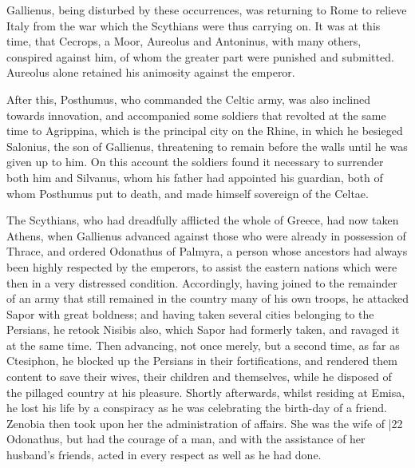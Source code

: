 Gallienus, being disturbed by these occurrences, was returning to Rome to relieve Italy from the war which the Scythians were thus carrying on. It was at this time, that Cecrops, a Moor, Aureolus and Antoninus, with many others, conspired against him, of whom the greater part were punished and submitted. Aureolus alone retained his animosity against the emperor.

After this, Posthumus, who commanded the Celtic army, was also inclined towards innovation, and accompanied some soldiers that revolted at the same time to Agrippina, which is the principal city on the Rhine, in which he besieged Salonius, the son of Gallienus, threatening to remain before the walls until he was given up to him. On this account the soldiers found it necessary to surrender both him and Silvanus, whom his father had appointed his guardian, both of whom Posthumus put to death, and made himself sovereign of the Celtae.

The Scythians, who had dreadfully afflicted the whole of Greece, had now taken Athens, when Gallienus advanced against
those who were already in possession of Thrace, and ordered Odonathus of Palmyra, a person whose ancestors had always been highly respected by the emperors, to assist the eastern nations which were then in a very distressed condition. Accordingly, having joined to the remainder of an army that still remained in the country many of his own troops, he attacked Sapor with great boldness; and having taken several cities belonging to the Persians, he retook Nisibis also, which Sapor had formerly taken, and ravaged it at the same time. Then advancing, not once merely, but a second time, as far as Ctesiphon, he blocked up the Persians in their fortifications, and rendered them content to save their wives, their children and themselves, while he disposed of the pillaged country at his pleasure. Shortly afterwards, whilst residing at Emisa, he lost his life by a conspiracy as he was celebrating the birth-day of a friend. Zenobia then took upon her the administration of affairs. She was the wife of
|22 Odonathus, but had the courage of a man, and with the assistance of her husband's friends, acted in every respect as well as he had done.

